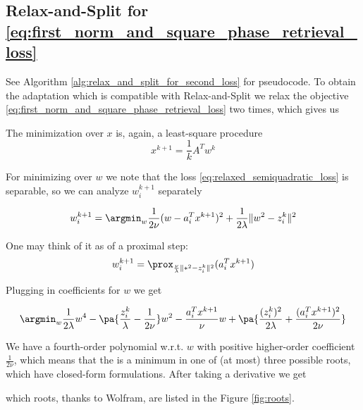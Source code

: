 \documentclass[11pt,letterpaper]{article}
\numberwithin{equation}{section} %
\numberwithin{figure}{section} %
\numberwithin{table}{section} %
\begin{document}
\subsection{Relax-and-Split for \ref{eq:first_norm_and_square_phase_retrieval_loss}}
See Algorithm \ref{alg:relax_and_split_for_second_loss} for pseudocode. To obtain the adaptation which is compatible with Relax-and-Split we relax the objective \ref{eq:first_norm_and_square_phase_retrieval_loss} two times, which gives us


The minimization over $x$ is, again, a least-square procedure 
\[
    x^{k+1} = \frac{1}{k}A^Tw^k
\]

For minimizing over $w$ we note that the loss \ref{eq:relaxed_semiquadratic_loss} is separable, so we can analyze $w_i^{k+1}$ separately

\begin{equation}
    \label{eq:w_subproblem}
    w^{k+1}_i = \argmin_{w} \frac{1}{2\nu}(w - a_i^Tx^{k+1})^2 + \frac{1}{2\lambda}\|w^2 - z^{k}_i\|^2
\end{equation}

One may think of it as of a proximal step:
\[
    w_i^{k+1} = \prox_{\frac{\nu}{\lambda}\|*^2 - z_i^k\|^2}(a^T_ix^{k+1})
\]

Plugging in coefficients for $w$ we get

\[
    \argmin_w \frac{1}{2\lambda}w^4 - \pa{\frac{z_i^{k}}{\lambda} - \frac{1}{2\nu}}w^2 - \frac{a_i^Tx^{k+1}}{\nu}w + \pa{\frac{(z_i^{k})^2}{2\lambda} + \frac{(a_i^Tx^{k+1})^2}{2\nu}}
\]

We have a fourth-order polynomial w.r.t. $w$ with positive higher-order coefficient $\frac{1}{2\nu}$, which means that the is a minimum in one of (at most) three possible roots, which have closed-form formulations. After taking a derivative we get


which roots, thanks to Wolfram, are listed in the Figure \ref{fig:roots}.
\end{document}
